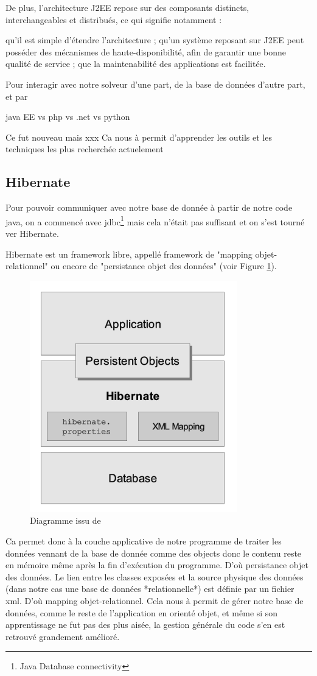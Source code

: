 De plus, l'architecture J2EE repose sur des composants distincts, interchangeables et distribués, ce qui signifie notamment :

qu'il est simple d'étendre l'architecture ;
qu'un système reposant sur J2EE peut posséder des mécanismes de haute-disponibilité, afin de garantir une bonne qualité de service ;
que la maintenabilité des applications est facilitée.

Pour interagir avec notre solveur d'une part, de la base de données d'autre part, et par


java EE vs php vs .net vs python

Ce fut nouveau mais xxx
Ca nous à permit d'apprender les outils et les techniques les plus recherchée actuelement 

\subsection{Hibernate}

Pour pouvoir communiquer avec notre base de donnée à partir de notre code java, on a commencé avec jdbc\footnote{Java Database connectivity} mais cela n'était pas suffisant et on s'est tourné ver Hibernate.

Hibernate est un framework libre, appellé framework de  "mapping objet-relationnel" ou encore de "persistance objet des données" (voir Figure \ref{reference2}). 
\begin{figure}[!h]
    \center
   	\includegraphics[scale=0.65]{schema_hibernate.png}
   	\caption{Diagramme issu de\url{}}
    \label{reference2}
\end{figure}
Ca permet donc à la couche applicative de notre programme de traiter les données vennant de la base de donnée comme des objects donc le contenu reste en mémoire même après la fin d'exécution du programme. D'où persistance objet des données. Le lien entre les classes exposées et la source physique des données (dans notre cas une base de données *relationnelle*) est définie par un fichier xml. D'où mapping objet-relationnel.
Cela nous à permit de gérer notre base de données, comme le reste de l'application en orienté objet, et même si son apprentissage ne fut pas des plus aisée, la gestion générale du code s'en est retrouvé grandement amélioré.


